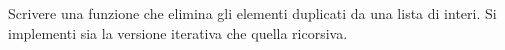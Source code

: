 \begin{Exercise}[label={ex:duplicati}]
    Scrivere una funzione che elimina gli elementi duplicati da una lista di interi.
    Si implementi sia la versione iterativa che quella ricorsiva.
\end{Exercise}

\begin{Answer}[ref={ex:duplicati}]
  	
\end{Answer}